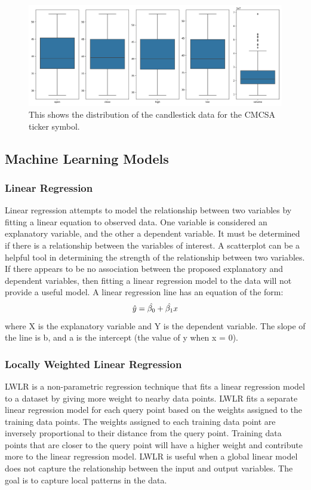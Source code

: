 \documentclass[conference]{IEEEtran}
\begin{document}
\begin{figure}
    \includegraphics[width=\columnwidth]{data_distribution}
    \caption{This shows the distribution of the candlestick data for the CMCSA ticker symbol.}
\end{figure}

\subsection{Machine Learning Models}

\subsubsection{Linear Regression}
Linear regression attempts to model the relationship between two variables by fitting a linear equation to observed data.
One variable is considered an explanatory variable, and the other a dependent variable.
It must be determined if there is a relationship between the variables of interest.
A scatterplot can be a helpful tool in determining the strength of the relationship between two variables.
If there appears to be no association between the proposed explanatory and dependent variables, then fitting a linear regression model to the data will not provide a useful model.
A linear regression line has an equation of the form:
\begin{equation}
\hat{y} = \hat{\beta_{0}} + \hat{\beta_{1}}x  \\ \label{eq:1}
\end{equation}
where X is the explanatory variable and Y is the dependent variable.
The slope of the line is b, and a is the intercept (the value of y when x = 0).


\subsubsection{Locally Weighted Linear Regression}
LWLR is a non-parametric regression technique that fits a linear regression model to a dataset by giving more weight to nearby data points.
LWLR fits a separate linear regression model for each query point based on the weights assigned to the training data points.
The weights assigned to each training data point are inversely proportional to their distance from the query point.
Training data points that are closer to the query point will have a higher weight and contribute more to the linear regression model.
LWLR is useful when a global linear model does not capture the relationship between the input and output variables.
The goal is to capture local patterns in the data.
\end{document}
